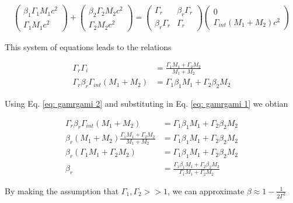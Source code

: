 \documentclass[linenumbers,twocolumn]{aastex631}
\begin{document}
\begin{appendix}
\begin{align}
	\begin{pmatrix}
	\beta_1\Gamma_1 M_1 c^2\\
	\Gamma_1 M_1 c^2
	\end{pmatrix}
	+
	\begin{pmatrix}
	\beta_2\Gamma_2 M_2 c^2 \\
	\Gamma_2 M_2 c^2
	\end{pmatrix}
	=
	\begin{pmatrix}
	\Gamma_r & \beta_r\Gamma_r\\
	\beta_r\Gamma_r & \Gamma_r
	\end{pmatrix}
	\begin{pmatrix}
	0 \\
	\Gamma_{int}(M_1 + M_2) c^2
	\end{pmatrix}
\end{align}

This system of equations leads to the relations

\begin{align}
	\Gamma_r \Gamma_i &= \frac{\Gamma_1M_1 + \Gamma_2M_2}{M_1+M_2} \label{eq: gamrgami 1}\\
	\Gamma_r\beta_r\Gamma_{int}(M_1+M_2) &= \Gamma_1\beta_1M_1+\Gamma_2\beta_2M_2 \label{eq: gamrgami 2}
\end{align}

Using Eq. \ref{eq: gamrgami 2} and substituting in Eq. \ref{eq: gamrgami 1} we obtian

\begin{align}
	\Gamma_r\beta_r\Gamma_{int}(M_1+M_2) &= \Gamma_1\beta_1M_1+\Gamma_2\beta_2M_2 \\
	\beta_r(M_1+M_2) \frac{\Gamma_1M_1 + \Gamma_2M_2}{M_1+M_2} &= \Gamma_1\beta_1M_1+\Gamma_2\beta_2M_2 \\
	\beta_r (\Gamma_1M_1 + \Gamma_2M_2) &= \Gamma_1\beta_1M_1+\Gamma_2\beta_2M_2 \\
	\beta_r &= \frac{\Gamma_1\beta_1M_1+\Gamma_2\beta_2M_2}{\Gamma_1M_1 + \Gamma_2M_2}
\end{align}

By making the assumption that $\Gamma_1, \Gamma_2 >> 1$, we can approximate $\beta \approx 1-\frac{1}{2\Gamma^2}$


\end{appendix}
\end{document}

